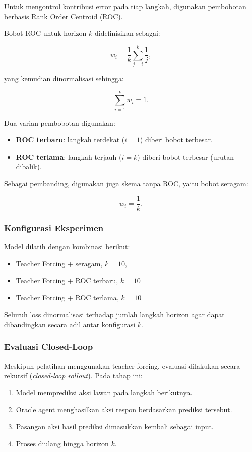 Untuk mengontrol kontribusi error pada tiap langkah, digunakan pembobotan berbasis Rank Order Centroid (ROC). 

Bobot ROC untuk horizon $k$ didefinisikan sebagai:

\[
w_i
=
\frac{1}{k}
\sum_{j=i}^{k}
\frac{1}{j},
\]

yang kemudian dinormalisasi sehingga:

\[
\sum_{i=1}^{k} w_i = 1.
\]

Dua varian pembobotan digunakan:

\begin{itemize}
    \item \textbf{ROC terbaru}: langkah terdekat ($i=1$) diberi bobot terbesar.
    \item \textbf{ROC terlama}: langkah terjauh ($i=k$) diberi bobot terbesar (urutan dibalik).
\end{itemize}

Sebagai pembanding, digunakan juga skema tanpa ROC, yaitu bobot seragam:

\[
w_i = \frac{1}{k}.
\]

\subsubsection{Konfigurasi Eksperimen}

Model dilatih dengan kombinasi berikut:

\begin{itemize}
    \item Teacher Forcing + seragam, $k = 10$, 
    \item Teacher Forcing + ROC terbaru, $k = 10$
    \item Teacher Forcing + ROC terlama, $k = 10$
\end{itemize}

Seluruh loss dinormalisasi terhadap jumlah langkah horizon agar dapat dibandingkan secara adil antar konfigurasi $k$.

\subsubsection{Evaluasi Closed-Loop}

Meskipun pelatihan menggunakan teacher forcing, evaluasi dilakukan secara rekursif (\textit{closed-loop rollout}). Pada tahap ini:

\begin{enumerate}
    \item Model memprediksi aksi lawan pada langkah berikutnya.
    \item Oracle agent menghasilkan aksi respon berdasarkan prediksi tersebut.
    \item Pasangan aksi hasil prediksi dimasukkan kembali sebagai input.
    \item Proses diulang hingga horizon $k$.
\end{enumerate}

